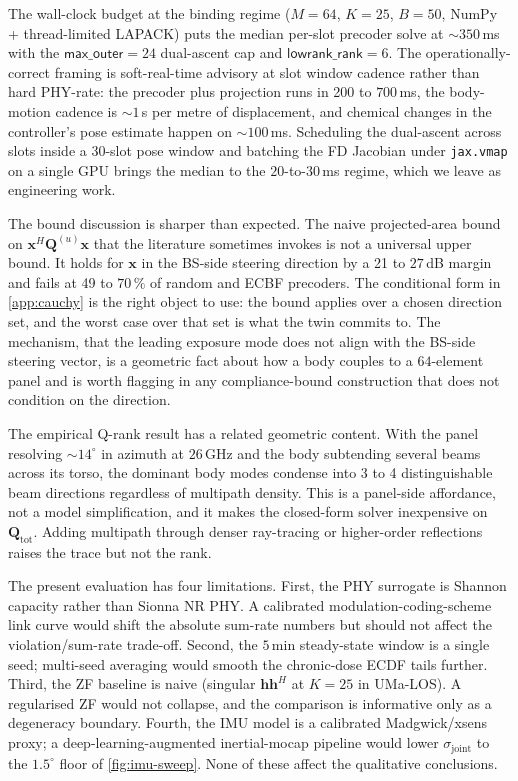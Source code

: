 \documentclass[journal,twocolumn,10pt]{IEEEtran}
\theoremstyle{plain}
\theoremstyle{remark}
\newcommand{\xx}{\mathbf{x}}
\newcommand{\hh}{\mathbf{h}}
\newcommand{\Qmat}{\mathbf{Q}}
\begin{document}
The wall-clock budget at the binding regime ($M = 64$, $K = 25$,
$B = 50$, NumPy + thread-limited LAPACK) puts the median per-slot
precoder solve at $\sim 350\,$ms with the $\textsf{max\_outer} =
24$ dual-ascent cap and $\textsf{lowrank\_rank} = 6$. The
operationally-correct framing is soft-real-time advisory at slot
window cadence rather than hard PHY-rate: the precoder plus
projection runs in 200 to $700\,$ms, the body-motion cadence is
$\sim 1\,$s per metre of displacement, and chemical changes in the
controller's pose estimate happen on $\sim 100\,$ms. Scheduling
the dual-ascent across slots inside a 30-slot pose window and
batching the FD Jacobian under \texttt{jax.vmap} on a single GPU
brings the median to the $20$-to-$30\,$ms regime, which we leave
as engineering work.

The bound discussion is sharper than expected. The naive
projected-area bound on $\xx^H \Qmat^{(u)} \xx$ that the literature
sometimes invokes is not a universal upper bound. It holds for $\xx$
in the BS-side steering direction by a 21 to $27\,$dB margin and
fails at 49 to $70\,\%$ of random and ECBF precoders. The
conditional form in \cref{app:cauchy} is the right object to use:
the bound applies over a chosen direction set, and the worst case
over that set is what the twin commits to. The mechanism, that the
leading exposure mode does not align with the BS-side steering
vector, is a geometric fact about how a body couples to a
$64$-element panel and is worth flagging in any compliance-bound
construction that does not condition on the direction.

The empirical Q-rank result has a related geometric content. With
the panel resolving $\sim 14^\circ$ in azimuth at $26\,$GHz and the
body subtending several beams across its torso, the dominant body
modes condense into 3 to 4 distinguishable beam directions
regardless of multipath density. This is a panel-side affordance,
not a model simplification, and it makes the closed-form solver
inexpensive on $\Qmat_{\mathrm{tot}}$. Adding multipath through
denser ray-tracing or higher-order reflections raises the trace but
not the rank.

The present evaluation has four limitations. First, the PHY surrogate
is Shannon capacity rather than Sionna NR PHY. A calibrated
modulation-coding-scheme link curve would shift the absolute
sum-rate numbers but should not affect the violation/sum-rate
trade-off. Second, the $5\,$min steady-state window is a single seed;
multi-seed averaging would smooth the chronic-dose ECDF tails further.
Third, the ZF baseline is naive (singular $\hh \hh^H$ at $K = 25$ in
UMa-LOS). A regularised ZF would not collapse, and the comparison is
informative only as a degeneracy boundary. Fourth, the IMU model is
a calibrated Madgwick/xsens proxy; a deep-learning-augmented
inertial-mocap pipeline would lower $\sigma_{\mathrm{joint}}$ to the
$1.5^\circ$ floor of \cref{fig:imu-sweep}. None of these affect the
qualitative conclusions.
\end{document}
